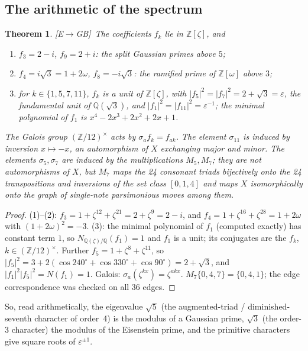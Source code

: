\documentclass[11pt]{amsart}
\numberwithin{equation}{section}
\theoremstyle{plain}
\newtheorem{theorem}{Theorem}[section]
\theoremstyle{definition}\newtheorem{definition}[theorem]{Definition}
\theoremstyle{remark}\newtheorem{remark}[theorem]{Remark}
\newcommand{\Z}{\mathbb{Z}}\newcommand{\Q}{\mathbb{Q}}\newcommand{\C}{\mathbb{C}}\newcommand{\F}{\mathbb{F}}\newcommand{\R}{\mathbb{R}}
\newcommand{\ctag}[1]{\textup{\textsf{\scriptsize[#1]}}}
\begin{document}
\subsection{The arithmetic of the spectrum}
\begin{theorem}\label{thm:arith}
\ctag{E$\to$GB}\ The coefficients $f_k$ lie in $\Z[\zeta]$, and
\begin{enumerate}[nosep]
\item $f_3=2-i$, $f_9=2+i$: the split Gaussian primes above $5$;
\item $f_4=i\sqrt3=1+2\omega$, $f_8=-i\sqrt3$: the ramified prime of $\Z[\omega]$ above $3$;
\item for $k\in\{1,5,7,11\}$, $f_k$ is a unit of $\Z[\zeta]$, with $|f_5|^2=|f_7|^2=2+\sqrt3=\varepsilon$, the fundamental unit of $\Q(\sqrt3)$, and $|f_1|^2=|f_{11}|^2=\varepsilon^{-1}$; the minimal polynomial of $f_1$ is $x^4-2x^3+2x^2+2x+1$.
\end{enumerate}
The Galois group $(\Z/12)^\times$ acts by $\sigma_a f_k=f_{ak}$. The element $\sigma_{11}$ is induced by inversion $x\mapsto -x$, an automorphism of $X$ exchanging major and minor. The elements $\sigma_5,\sigma_7$ are induced by the multiplications $M_5,M_7$; they are not automorphisms of $X$, but $M_7$ maps the 24 consonant triads bijectively onto the 24 transpositions and inversions of the set class $[0,1,4]$ and maps $X$ isomorphically onto the graph of single-note parsimonious moves among them.
\end{theorem}
\begin{proof}
(1)--(2): $f_3=1+\zeta^{12}+\zeta^{21}=2+\zeta^9=2-i$, and $f_4=1+\zeta^{16}+\zeta^{28}=1+2\omega$ with $(1+2\omega)^2=-3$. (3): the minimal polynomial of $f_1$ (computed exactly) has constant term $1$, so $N_{\Q(\zeta)/\Q}(f_1)=1$ and $f_1$ is a unit; its conjugates are the $f_k$, $k\in(\Z/12)^\times$. Further $f_5=1+\zeta^{8}+\zeta^{11}$, so $|f_5|^2=3+2(\cos240^\circ+\cos330^\circ+\cos90^\circ)=2+\sqrt3$, and $|f_1|^2|f_5|^2=N(f_1)=1$. Galois: $\sigma_a(\zeta^{kx})=\zeta^{akx}$. $M_7\{0,4,7\}=\{0,4,1\}$; the edge correspondence was checked on all 36 edges.
\end{proof}

So, read arithmetically, the eigenvalue $\sqrt5$ (the augmented-triad / diminished-seventh character of order~4) is the modulus of a Gaussian prime, $\sqrt3$ (the order-3 character) the modulus of the Eisenstein prime, and the primitive characters give square roots of $\varepsilon^{\pm1}$.
\end{document}
